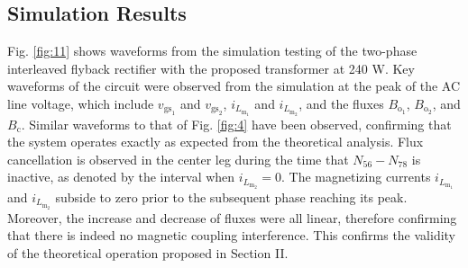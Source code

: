 \documentclass[lettersize,journal]{IEEEtran}
\begin{document}
\subsection{Simulation Results}
Fig. \ref{fig:11} shows waveforms from the simulation testing of the two-phase interleaved flyback rectifier with the proposed transformer at 240 W. Key waveforms of the circuit were observed from the simulation {\color{red} at the peak of the AC line voltage}, which include $v_{\mathrm{gs}_1}$ and $v_{\mathrm{gs}_2}$, $i_{L_{\mathrm{m}_1}}$ and $i_{L_{\mathrm{m}_2}}$, and the fluxes $B_{\mathrm{o}_1}$, $B_{\mathrm{o}_2}$, and $B_{\mathrm{c}}$. Similar waveforms to that of Fig. \ref{fig:4} have been observed, confirming that the system operates exactly as expected from the theoretical analysis. Flux cancellation is observed in the center leg during the time that $N_{56}-N_{78}$ is inactive, as denoted by the interval when $i_{L_{\mathrm{m}_2}} = 0$. The magnetizing currents $i_{L_{\mathrm{m}_1}}$ and $i_{L_{\mathrm{m}_2}}$ subside to zero prior to the subsequent phase reaching its peak. Moreover, the increase and decrease of fluxes were all linear, therefore confirming that there is indeed no magnetic coupling interference. This confirms the validity of the theoretical operation proposed in Section II.
\end{document}
